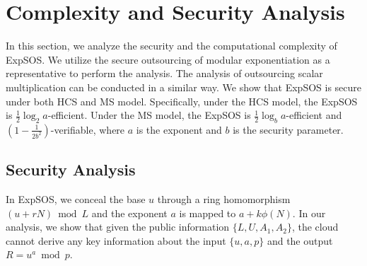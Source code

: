 \documentclass[english,draftcls,onecolumn,11pt]{IEEEtran}
\theoremstyle{definition}
\theoremstyle{plain}
\theoremstyle{plain}
\theoremstyle{definition}
\begin{document}
\section{Complexity and Security Analysis \label{sec:Complexity-and-Security}}

In this section, we analyze the security and the computational complexity
of ExpSOS. We utilize the secure outsourcing of modular exponentiation
as a representative to perform the analysis. The analysis of outsourcing
scalar multiplication can be conducted in a similar way. We show that
ExpSOS is secure under both HCS and MS model. Specifically, under
the HCS model, the ExpSOS is $\frac{1}{2}\log_{2}a$-efficient. Under
the MS model, the ExpSOS is $\frac{1}{2}\log_{b}a$-efficient and
$(1-\frac{1}{2b^{2}})$-verifiable, where $a$ is the exponent and
$b$ is the security parameter.


\subsection{Security Analysis}

In ExpSOS, we conceal the base $u$ through a ring homomorphism $(u+rN)\bmod L$
and the exponent $a$ is mapped to $a+k\phi(N)$. In our analysis,
we show that given the public information $\{L,U,A_{1},A_{2}\}$,
the cloud cannot derive any key information about the input $\{u,a,p\}$
and the output $R=u^{a}\bmod p$.
\end{document}

